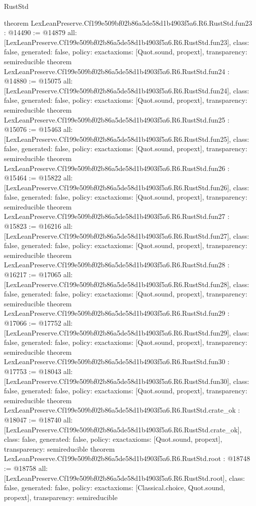 \begin{lexlean}{RustStd}
\begin{coremodule}
{}
theorem LexLeanPreserve.Cf199e509bf02b86a5de58d1b4903f5a6.R6.RustStd.fun23 : @14490 := @14879 {
  all: [LexLeanPreserve.Cf199e509bf02b86a5de58d1b4903f5a6.R6.RustStd.fun23],
  class: false,
  generated: false,
  policy: exact{axioms: [Quot.sound, propext]},
  transparency: semireducible
}
theorem LexLeanPreserve.Cf199e509bf02b86a5de58d1b4903f5a6.R6.RustStd.fun24 : @14880 := @15075 {
  all: [LexLeanPreserve.Cf199e509bf02b86a5de58d1b4903f5a6.R6.RustStd.fun24],
  class: false,
  generated: false,
  policy: exact{axioms: [Quot.sound, propext]},
  transparency: semireducible
}
theorem LexLeanPreserve.Cf199e509bf02b86a5de58d1b4903f5a6.R6.RustStd.fun25 : @15076 := @15463 {
  all: [LexLeanPreserve.Cf199e509bf02b86a5de58d1b4903f5a6.R6.RustStd.fun25],
  class: false,
  generated: false,
  policy: exact{axioms: [Quot.sound, propext]},
  transparency: semireducible
}
theorem LexLeanPreserve.Cf199e509bf02b86a5de58d1b4903f5a6.R6.RustStd.fun26 : @15464 := @15822 {
  all: [LexLeanPreserve.Cf199e509bf02b86a5de58d1b4903f5a6.R6.RustStd.fun26],
  class: false,
  generated: false,
  policy: exact{axioms: [Quot.sound, propext]},
  transparency: semireducible
}
theorem LexLeanPreserve.Cf199e509bf02b86a5de58d1b4903f5a6.R6.RustStd.fun27 : @15823 := @16216 {
  all: [LexLeanPreserve.Cf199e509bf02b86a5de58d1b4903f5a6.R6.RustStd.fun27],
  class: false,
  generated: false,
  policy: exact{axioms: [Quot.sound, propext]},
  transparency: semireducible
}
theorem LexLeanPreserve.Cf199e509bf02b86a5de58d1b4903f5a6.R6.RustStd.fun28 : @16217 := @17065 {
  all: [LexLeanPreserve.Cf199e509bf02b86a5de58d1b4903f5a6.R6.RustStd.fun28],
  class: false,
  generated: false,
  policy: exact{axioms: [Quot.sound, propext]},
  transparency: semireducible
}
theorem LexLeanPreserve.Cf199e509bf02b86a5de58d1b4903f5a6.R6.RustStd.fun29 : @17066 := @17752 {
  all: [LexLeanPreserve.Cf199e509bf02b86a5de58d1b4903f5a6.R6.RustStd.fun29],
  class: false,
  generated: false,
  policy: exact{axioms: [Quot.sound, propext]},
  transparency: semireducible
}
theorem LexLeanPreserve.Cf199e509bf02b86a5de58d1b4903f5a6.R6.RustStd.fun30 : @17753 := @18043 {
  all: [LexLeanPreserve.Cf199e509bf02b86a5de58d1b4903f5a6.R6.RustStd.fun30],
  class: false,
  generated: false,
  policy: exact{axioms: [Quot.sound, propext]},
  transparency: semireducible
}
theorem LexLeanPreserve.Cf199e509bf02b86a5de58d1b4903f5a6.R6.RustStd.crate_ok : @18047 := @18740 {
  all: [LexLeanPreserve.Cf199e509bf02b86a5de58d1b4903f5a6.R6.RustStd.crate_ok],
  class: false,
  generated: false,
  policy: exact{axioms: [Quot.sound, propext]},
  transparency: semireducible
}
theorem LexLeanPreserve.Cf199e509bf02b86a5de58d1b4903f5a6.R6.RustStd.root : @18748 := @18758 {
  all: [LexLeanPreserve.Cf199e509bf02b86a5de58d1b4903f5a6.R6.RustStd.root],
  class: false,
  generated: false,
  policy: exact{axioms: [Classical.choice, Quot.sound, propext]},
  transparency: semireducible
}


\end{coremodule}
\end{lexlean}

